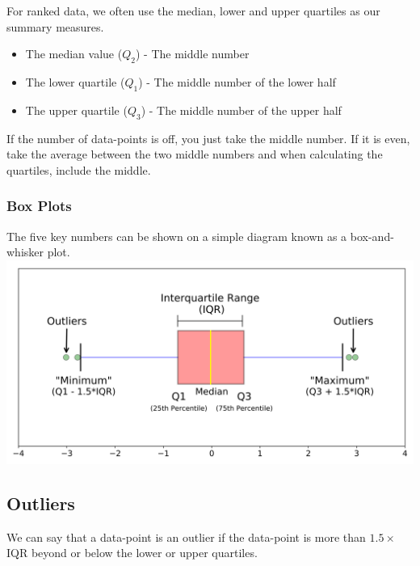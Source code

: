 \documentclass[a4paper,12pt]{article}
\begin{document}
For ranked data, we often use the median, lower and upper quartiles as our summary measures. 
\begin{itemize}
	\item The median value ($Q_2$) - The middle number 
	\item The lower quartile ($Q_1$) - The middle number of the lower half
	\item The upper quartile ($Q_3$) - The middle number of the upper half
\end{itemize}
If the number of data-points is off, you just take the middle number. If it is even, take the average between the two middle numbers and when calculating the quartiles, include the middle.

\subsubsection*{Box Plots} 
The five key numbers can be shown on a simple diagram known as a box-and-whisker plot.\\
\includegraphics[scale=0.07]{BoxPlot}\\

\subsection*{Outliers}
We can say that a data-point is an outlier if the data-point is more than $1.5 \times$ IQR beyond or below the lower or upper quartiles. 
\end{document}
